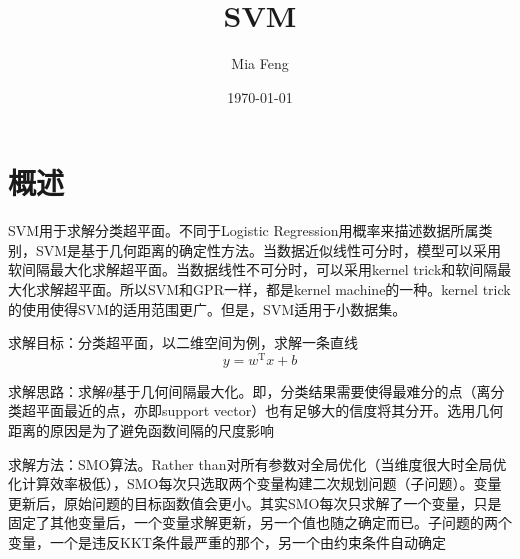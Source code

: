 \documentclass{ctexart}
\title{SVM} %
\author{Mia Feng} %
\date{\today} %
\begin{document}
\maketitle %




\section{概述}
SVM用于求解分类超平面。不同于Logistic Regression用概率来描述数据所属类别，SVM是基于几何距离的确定性方法。当数据近似线性可分时，模型可以采用软间隔最大化求解超平面。当数据线性不可分时，可以采用kernel trick和软间隔最大化求解超平面。所以SVM和GPR一样，都是kernel machine的一种。kernel trick的使用使得SVM的适用范围更广。但是，SVM适用于小数据集。

求解目标：分类超平面，以二维空间为例，求解一条直线
\begin{equation}
y = w^{\mathrm{T}}x+b
\end{equation}

求解思路：求解$\theta$基于几何间隔最大化。即，分类结果需要使得最难分的点（离分类超平面最近的点，亦即support vector）也有足够大的信度将其分开。选用几何距离的原因是为了避免函数间隔的尺度影响

求解方法：SMO算法。Rather than对所有参数对全局优化（当维度很大时全局优化计算效率极低），SMO每次只选取两个变量构建二次规划问题（子问题）。变量更新后，原始问题的目标函数值会更小。其实SMO每次只求解了一个变量，只是固定了其他变量后，一个变量求解更新，另一个值也随之确定而已。子问题的两个变量，一个是违反KKT条件最严重的那个，另一个由约束条件自动确定
\end{document}
